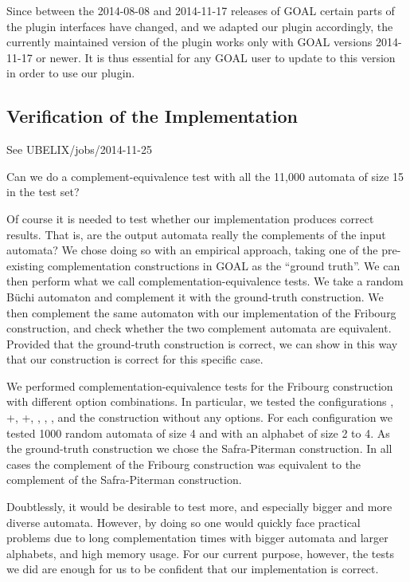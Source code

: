 Since between the 2014-08-08 and 2014-11-17 releases of GOAL certain parts of the plugin interfaces have changed, and we adapted our plugin accordingly, the currently maintained version of the plugin works only with GOAL versions 2014-11-17 or newer. It is thus essential for any GOAL user to update to this version in order to use our plugin.

\subsection{Verification of the Implementation}

See UBELIX/jobs/2014-11-25

Can we do a complement-equivalence test with all the 11,000 automata of size 15 in the test set?

Of course it is needed to test whether our implementation produces correct results. That is, are the output automata really the complements of the input automata? We chose doing so with an empirical approach, taking one of the pre-existing complementation constructions in GOAL as the ``ground truth''. We can then perform what we call complementation-equivalence tests. We take a random Büchi automaton and complement it with the ground-truth construction. We then complement the same automaton with our implementation of the Fribourg construction, and check whether the two complement automata are equivalent. Provided that the ground-truth construction is correct, we can show in this way that our construction is correct for this specific case.

We performed complementation-equivalence tests for the Fribourg construction with different option combinations. In particular, we tested the configurations , +, +, , , , and the construction without any options. For each configuration we tested 1000 random automata of size 4 and with an alphabet of size 2 to 4. As the ground-truth construction we chose the Safra-Piterman construction. In all cases the complement of the Fribourg construction was equivalent to the complement of the Safra-Piterman construction.

Doubtlessly, it would be desirable to test more, and especially bigger and more diverse automata. However, by doing so one would quickly face practical problems due to long complementation times with bigger automata and larger alphabets, and high memory usage. For our current purpose, however, the tests we did are enough for us to be confident that our implementation is correct.

